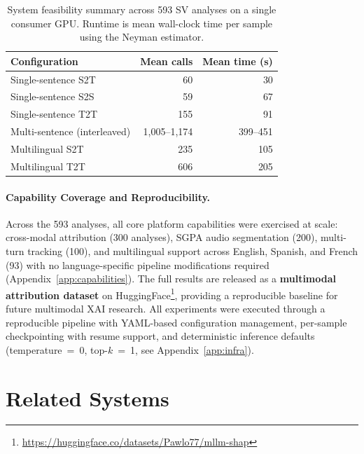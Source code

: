 \documentclass[11pt]{article}
\begin{document}
\begin{table}[ht]
\centering
\small
\caption{System feasibility summary across 593 SV analyses on a single consumer GPU. Runtime is mean wall-clock time per sample using the Neyman estimator.}
\begin{tabular}{lrr}
\toprule
\textbf{Configuration} & \textbf{Mean calls} & \textbf{Mean time (s)} \\
\midrule
Single-sentence S2T    & 60   & 30  \\
Single-sentence S2S    & 59   & 67  \\
Single-sentence T2T    & 155  & 91  \\
Multi-sentence (interleaved) & 1{,}005--1{,}174  & 399--451 \\
Multilingual S2T       & 235  & 105 \\
Multilingual T2T       & 606  & 205 \\
\bottomrule
\end{tabular}
\label{tab:feasibility}
\end{table}

\paragraph{Capability Coverage and Reproducibility.}
Across the 593 analyses, all core platform capabilities were exercised at scale: cross-modal attribution (300 analyses), SGPA audio segmentation (200), multi-turn tracking (100), and multilingual support across English, Spanish, and French (93) with no language-specific pipeline modifications required (Appendix~\ref{app:capabilities}).
The full results are released as a \textbf{multimodal attribution dataset} on HuggingFace\footnote{\url{https://huggingface.co/datasets/Pawlo77/mllm-shap}}, providing a reproducible baseline for future multimodal XAI research.
All experiments were executed through a reproducible pipeline with YAML-based configuration management, per-sample checkpointing with resume support, and deterministic inference defaults (temperature~=~0, top-$k$~=~1, see Appendix~\ref{app:infra}).

\section{Related Systems}
\label{sec:related}
\end{document}
